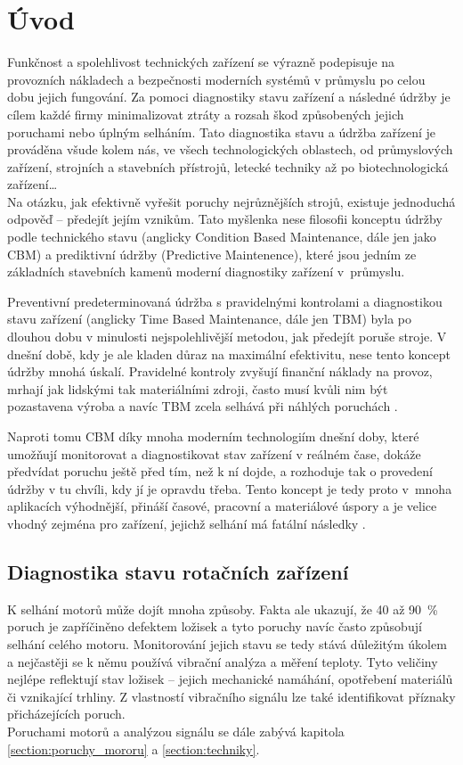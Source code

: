 \chapter{Úvod}
    
    Funkčnost a spolehlivost technických zařízení se výrazně podepisuje na provozních nákladech a bezpečnosti moderních systémů v průmyslu po celou dobu jejich fungování. 
    Za pomoci diagnostiky stavu zařízení a následné údržby je cílem každé firmy minimalizovat ztráty a rozsah škod způsobených jejich poruchami nebo úplným selháním. Tato diagnostika stavu a údržba zařízení je prováděna  všude kolem nás, ve všech technologických oblastech, od průmyslových zařízení, strojních a stavebních přístrojů, letecké techniky až po biotechnologická zařízení\ldots\\
    Na otázku, jak efektivně vyřešit poruchy nejrůznějších strojů, existuje jednoduchá odpověď – předejít jejím vznikům. Tato myšlenka nese filosofii konceptu údržby podle technického stavu (anglicky Condition Based Maintenance, dále jen jako CBM) a prediktivní údržby (Predictive Maintenence), které jsou jedním ze základních stavebních kamenů moderní diagnostiky zařízení v~průmyslu.
    
    Preventivní predeterminovaná údržba s pravidelnými kontrolami a diagnostikou stavu zařízení (anglicky Time Based Maintenance, dále jen TBM) byla po dlouhou dobu v minulosti nejspolehlivější metodou, jak předejít poruše stroje. V dnešní době, kdy je ale kladen důraz na maximální efektivitu, nese tento koncept údržby mnohá úskalí. Pravidelné kontroly zvyšují finanční náklady na provoz, mrhají jak lidskými tak materiálními zdroji, často musí kvůli nim být pozastavena výroba a navíc TBM zcela selhává při náhlých poruchách \cite{website:9}.
    
    Naproti tomu CBM díky mnoha moderním technologiím dnešní doby, které umožňují monitorovat a diagnostikovat stav zařízení v reálném čase, dokáže předvídat poruchu ještě před tím, než k ní dojde, a rozhoduje tak o provedení údržby v tu chvíli, kdy jí je opravdu třeba. Tento koncept je tedy proto v~mnoha aplikacích výhodnější, přináší časové, pracovní a materiálové úspory a je velice vhodný zejména pro zařízení, jejichž selhání má fatální následky \cite{website:9}.

\section{Diagnostika stavu rotačních zařízení}
    K selhání motorů může dojít mnoha způsoby. Fakta ale ukazují, že 40 až 90~\% poruch je zapříčiněno defektem ložisek \cite{book:1} a tyto poruchy navíc často způsobují selhání celého motoru.
    Monitorování jejich stavu se tedy stává důležitým úkolem a nejčastěji se k němu používá vibrační analýza a měření teploty. Tyto veličiny nejlépe reflektují stav ložisek – jejich mechanické namáhání, opotřebení materiálů či vznikající trhliny. Z vlastností vibračního signálu lze také identifikovat příznaky přicházejících poruch.\\
    Poruchami motorů a analýzou signálu se dále zabývá kapitola \ref{section:poruchy_mororu} a \ref{section:techniky}.
    
